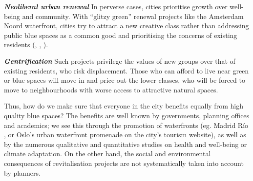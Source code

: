 \documentclass{article}
\newcommand{\bisection}[1]{\textbf{\textit{#1}}}
\begin{document}
\bisection{Neoliberal urban renewal} In perverse cases, cities prioritise growth over well-being and community. With ``glitzy green'' \parencite{anguelovski2021green} renewal projects like the Amsterdam Noord waterfront, cities try to attract a new creative class rather than addressing public blue spaces as a common good and prioritising the concerns of existing residents (\cite{wessells2014urban}, \cite{anguelovski2020expanding}, \cite{del2021dismantling}).

\bisection{Gentrification} Such projects privilege the values of new groups over that of existing residents, who risk displacement. Those who can afford to live near green or blue spaces will move in and price out the lower classes, who will be forced to move to neighbourhoods with worse access to attractive natural spaces. 


Thus, how do we make sure that everyone in the city benefits equally from high quality blue spaces? The benefits are well known by governments, planning offices and academics; we see this through the promotion of waterfronts (eg. Madrid Río \parencite{madridrio}, or Oslo's urban waterfront promenade \parencite{visitoslo} on the city's tourism website), as well as by the numerous qualitative and quantitative studies on health and well-being or climate adaptation.
On the other hand, the social and environmental consequences of revitalisation projects are not systematically taken into account by planners. 



\end{document}

